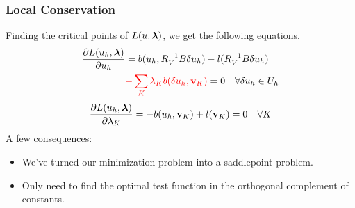 \documentclass{beamer}
\begin{document}
\begin{frame}
\frametitle{Local Conservation}
Finding the critical points of $L(u,\boldsymbol\lambda)$, we get the following
equations.
\begin{align*}
\frac{\partial L(u_h,\boldsymbol\lambda)}{\partial u_h}&=b(u_h,R_V^{-1}B\delta u_h)
-l(R_V^{-1}B\delta u_h)\\
&{\color{red}-\sum_K\lambda_K b(\delta
u_h,\mathbf{v}_K)}=0\quad\forall\delta u_h\in U_h
\end{align*}
\[
\frac{\partial
L(u_h,\boldsymbol\lambda)}{\partial\lambda_K}=-b(u_h,\mathbf{v}_K)+l(\mathbf{v}_K)=0\quad\forall
K
\]
A few consequences:
\begin{itemize}
\item We've turned our minimization problem into a saddlepoint problem.
\item Only need to find the optimal test function in the orthogonal complement
of constants. %
\end{itemize}
\end{frame}

\end{document}
